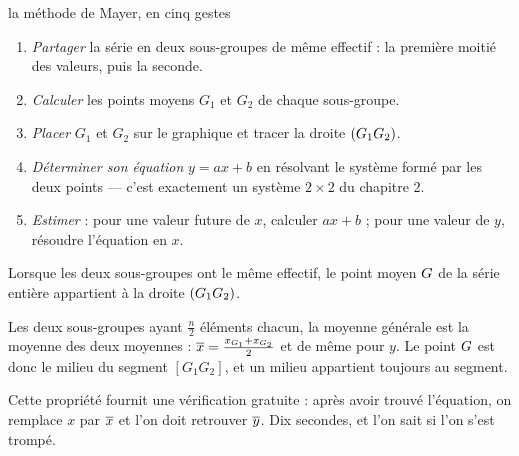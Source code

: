\begin{methode}{la méthode de Mayer, en cinq gestes}
\begin{enumerate}[label=\textbf{\arabic*.}, leftmargin=*, itemsep=0.15em]
  \item \emph{Partager} la série en deux sous-groupes de même effectif : la
        première moitié des valeurs, puis la seconde.
  \item \emph{Calculer} les points moyens $G_{1}$ et $G_{2}$ de chaque
        sous-groupe.
  \item \emph{Placer} $G_{1}$ et $G_{2}$ sur le graphique et tracer la
        droite $(G_{1}G_{2})$.
  \item \emph{Déterminer son équation} $y = ax+b$ en résolvant le système
        formé par les deux points — c'est exactement un système
        $2\times2$ du chapitre 2.
  \item \emph{Estimer} : pour une valeur future de $x$, calculer $ax+b$ ;
        pour une valeur de $y$, résoudre l'équation en $x$.
\end{enumerate}
\end{methode}

\begin{propriete}
Lorsque les deux sous-groupes ont le même effectif, le point moyen
$G$ de la série entière appartient à la droite $(G_{1}G_{2})$.
\end{propriete}

\begin{demonstration}
Les deux sous-groupes ayant $\frac n2$ éléments chacun, la moyenne générale
est la moyenne des deux moyennes :
$\overline{x} = \frac{x_{G_{1}}+x_{G_{2}}}{2}$ et de même pour $y$. Le point
$G$ est donc le milieu du segment $\left[G_{1}G_{2}\right]$, et un
milieu appartient toujours au segment.
\end{demonstration}

\begin{remarque}
Cette propriété fournit une vérification gratuite : après avoir trouvé
l'équation, on remplace $x$ par $\overline{x}$ et l'on doit retrouver $\overline{y}$.
Dix secondes, et l'on sait si l'on s'est trompé.
\end{remarque}

